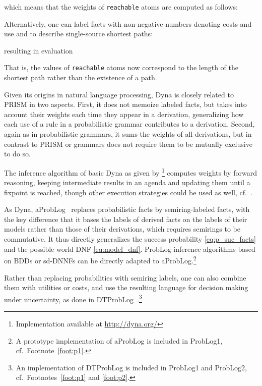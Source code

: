 \documentclass[a4paper]{article}
\begin{document}
which means that the weights of \verb|reachable| atoms are computed as follows:

Alternatively, one can label facts with non-negative numbers denoting costs and use 
and  to describe single-source shortest paths:

resulting in evaluation

That is, the values of \verb|reachable| atoms now correspond to the
length of the shortest path rather than the existence of a path. 

Given its origins in natural language processing, Dyna is closely related to PRISM in two aspects. First, it does not memoize labeled
facts, but takes into account their weights each time they appear in a
derivation, generalizing how each use of a rule in a probabilistic
grammar contributes to a derivation. Second, again as in probabilistic
grammars, it sums the weights of all derivations, but in contrast to
PRISM or grammars does not require them to be mutually exclusive to do
so.

 The inference algorithm of basic Dyna as given by
 \cite{Eisner05}\footnote{Implementation available at \url{http://dyna.org/}}
computes weights by forward reasoning, keeping intermediate results in
an agenda and updating them until a fixpoint is reached, though other
execution strategies could be used as well,
cf.~\citep{eisner-filardo-2011}. 

As Dyna, aProbLog~\citep{kimmig:aaai11} replaces probabilistic facts
by semiring-labeled facts, with the key difference that it bases the
labels of derived facts on the labels of their models rather than
those of their derivations, which requires semirings to be commutative. It thus directly generalizes the success
probability \eqref{eq:p_suc_facts} and the possible world DNF
\eqref{eq:model_dnf}. ProbLog inference algorithms based on BDDs or
sd-DNNFs can be directly adapted to aProbLog.\footnote{A prototype implementation of aProbLog
  is included in ProbLog1, cf.~Footnote~\ref{foot:p1}.}

Rather than replacing probabilities with semiring labels, one can
also combine them with utilities or costs, and use the resulting
language for decision making under uncertainty, as done in
DTProbLog~\citep{vandenbroeck:aaai10}.\footnote{An
  implementation of DTProbLog is included in ProbLog1 and ProbLog2,
  cf.~Footnotes~\ref{foot:p1} and \ref{foot:p2}.}
\end{document}
